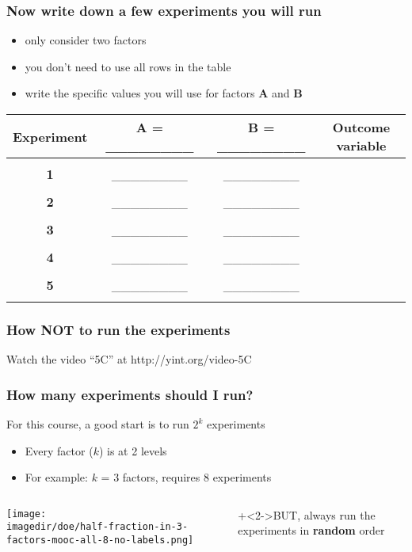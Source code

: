 \begin{frame}\frametitle{Now write down a few experiments you will run}
	\begin{itemize}
		\item	only consider two factors
		\item	you don't need to use all rows in the table
		\item	write the specific values you will use for factors \textbf{A} and \textbf{B}
	\end{itemize}
	
	\vspace{1cm}
	\begin{tabulary}{\linewidth}{c|c|c|c}
		\textbf{\relax Experiment} & \textbf{\relax A = \_\_\_\_\_\_\_\_} & \textbf{\relax B = \_\_\_\_\_\_\_\_} & \textbf{\relax Outcome variable } \\ \hline &  &  & \\
		\textbf{1} & \_\_\_\_\_\_\_\_  & \_\_\_\_\_\_\_\_ &   \\ &  &  & \\
		\textbf{2} & \_\_\_\_\_\_\_\_  & \_\_\_\_\_\_\_\_ &   \\ &  &  & \\
		\textbf{3} & \_\_\_\_\_\_\_\_  & \_\_\_\_\_\_\_\_ &   \\ &  &  & \\
		\textbf{4} & \_\_\_\_\_\_\_\_  & \_\_\_\_\_\_\_\_ &   \\ &  &  & \\
		\textbf{5} & \_\_\_\_\_\_\_\_  & \_\_\_\_\_\_\_\_ &   \\ &  &  & \\
	\end{tabulary}	
\end{frame}

\begin{frame}\frametitle{How \textbf{NOT} to run the experiments}
	Watch the video ``5C'' at http://yint.org/video-5C
\end{frame}

\begin{frame}\frametitle{How many experiments should I run?}
	For this course, a good start is to run $2^k$ experiments
	\begin{itemize}
		\item	Every factor ($k$) is at 2 levels
		\item	For example: $k$ = 3 factors, requires 8 experiments
	\end{itemize}
	
	
	
	\begin{columns}[c]
			\centerline{\texttt{[image: \\imagedir/doe/half-fraction-in-3-factors-mooc-all-8-no-labels.png]}}
			\onslide+<2->{{\color{red}BUT, always run the experiments in \textbf{random} order}}

	\end{columns}
	
\end{frame}

